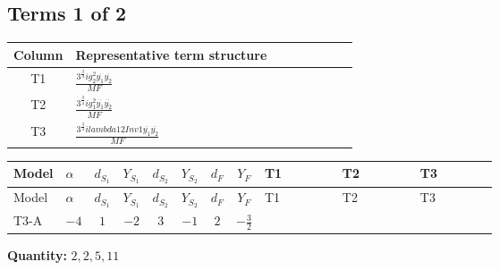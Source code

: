 \documentclass[8pt]{article}
\begin{document}
\begin{landscape}
\subsection*{Terms 1 of 2}
\begin{center}
\begin{tabular}{@{}c >{\raggedright\arraybackslash}p{0.82\linewidth}@{}}
\toprule
Column & Representative term structure \\
\midrule
T1 & \(\displaystyle \frac{3^{\frac{3}{4}} i g_{2}^{2} \overline{y_{1}} \overline{y_{2}}}{MF}\) \\
\midrule
T2 & \(\displaystyle \frac{3^{\frac{3}{4}} i g_{1}^{2} \overline{y_{1}} \overline{y_{2}}}{MF}\) \\
\midrule
T3 & \(\displaystyle \frac{3^{\frac{3}{4}} i lambda12Inv1 \overline{y_{1}} \overline{y_{2}}}{MF}\) \\
\midrule
\bottomrule
\end{tabular}
\end{center}
\smallskip
\tiny
\begin{longtable}{@{}llcccccc >{\raggedright\arraybackslash}p{0.21\linewidth} >{\raggedright\arraybackslash}p{0.21\linewidth} >{\raggedright\arraybackslash}p{0.21\linewidth}@{}}
\toprule
Model & $\alpha$ & $d_{S_1}$ & $Y_{S_1}$ & $d_{S_2}$ & $Y_{S_2}$ & $d_F$ & $Y_F$ & T1 & T2 & T3 \\
\midrule
\endfirsthead
\toprule
Model & $\alpha$ & $d_{S_1}$ & $Y_{S_1}$ & $d_{S_2}$ & $Y_{S_2}$ & $d_F$ & $Y_F$ & T1 & T2 & T3 \\
\midrule
\endhead
T3-A & $-4$ & $1$ & $-2$ & $3$ & $-1$ & $2$ & $-\frac{3}{2}$ & \scriptsize\adjustbox{max width=\linewidth}{$\begin{gathered} - \frac{11 \cdot 3^{\frac{3}{4}} i g_{2}^{2} \overline{y_{1}} \overline{y_{2}}}{8 MF}\end{gathered}$} & \scriptsize\adjustbox{max width=\linewidth}{$\begin{gathered} - \frac{9 \cdot 3^{\frac{3}{4}} i g_{1}^{2} \overline{y_{1}} \overline{y_{2}}}{8 MF}\end{gathered}$} & \scriptsize\adjustbox{max width=\linewidth}{$\begin{gathered} - \frac{3^{\frac{3}{4}} i lambda12Inv1 \overline{y_{1}} \overline{y_{2}}}{6 MF}\end{gathered}$} \\
\midrule
\bottomrule
\end{longtable}
\clearpage
\noindent\textbf{Quantity: }$\mathrm{2,2,5,11}$\par\smallskip

\end{landscape}
\end{document}
